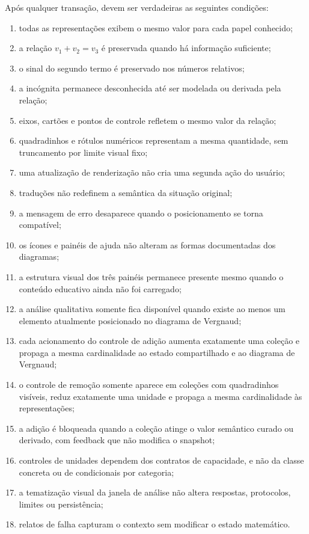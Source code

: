 \documentclass[12pt,a4paper]{article}
\begin{document}
Após qualquer transação, devem ser verdadeiras as seguintes condições:
\begin{enumerate}[noitemsep]
  \item todas as representações exibem o mesmo valor para cada papel conhecido;
  \item a relação $v_1+v_2=v_3$ é preservada quando há informação suficiente;
  \item o sinal do segundo termo é preservado nos números relativos;
  \item a incógnita permanece desconhecida até ser modelada ou derivada pela relação;
  \item eixos, cartões e pontos de controle refletem o mesmo valor da relação;
  \item quadradinhos e rótulos numéricos representam a mesma quantidade, sem truncamento por limite visual fixo;
  \item uma atualização de renderização não cria uma segunda ação do usuário;
  \item traduções não redefinem a semântica da situação original;
  \item a mensagem de erro desaparece quando o posicionamento se torna compatível;
  \item os ícones e painéis de ajuda não alteram as formas documentadas dos diagramas;
  \item a estrutura visual dos três painéis permanece presente mesmo quando o conteúdo educativo ainda não foi carregado;
  \item a análise qualitativa somente fica disponível quando existe ao menos um elemento atualmente posicionado no diagrama de Vergnaud;
  \item cada acionamento do controle de adição aumenta exatamente uma coleção e propaga a mesma cardinalidade ao estado compartilhado e ao diagrama de Vergnaud;
  \item o controle de remoção somente aparece em coleções com quadradinhos visíveis, reduz exatamente uma unidade e propaga a mesma cardinalidade às representações;
  \item a adição é bloqueada quando a coleção atinge o valor semântico curado ou derivado, com feedback que não modifica o snapshot;
  \item controles de unidades dependem dos contratos de capacidade, e não da classe concreta ou de condicionais por categoria;
  \item a tematização visual da janela de análise não altera respostas, protocolos, limites ou persistência;
  \item relatos de falha capturam o contexto sem modificar o estado matemático.
\end{enumerate}
\end{document}

